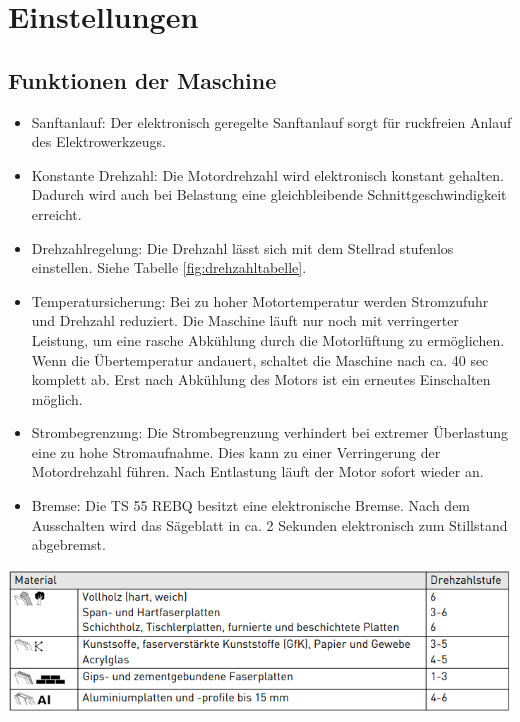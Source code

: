 \documentclass{\basedir/fablab-document}
\begin{document}
\section{Einstellungen}
\subsection{Funktionen der Maschine}
\begin{itemize}
\item Sanftanlauf: Der elektronisch geregelte Sanftanlauf sorgt für ruckfreien Anlauf des Elektrowerkzeugs.
\item Konstante Drehzahl: Die Motordrehzahl wird elektronisch konstant gehalten. Dadurch wird auch bei Belastung eine gleichbleibende Schnittgeschwindigkeit erreicht.
\item Drehzahlregelung: Die Drehzahl lässt sich mit dem Stellrad stufenlos einstellen. Siehe Tabelle \ref{fig:drehzahltabelle}.
\item Temperatursicherung: Bei zu hoher Motortemperatur werden Stromzufuhr und Drehzahl reduziert. Die Maschine läuft nur noch mit verringerter Leistung, um eine rasche Abkühlung durch die Motorlüftung zu ermöglichen. Wenn die Übertemperatur andauert, schaltet die Maschine nach ca. 40 sec komplett ab. Erst nach Abkühlung des Motors ist ein erneutes Einschalten möglich.
\item Strombegrenzung: Die Strombegrenzung verhindert bei extremer Überlastung eine zu hohe Stromaufnahme. Dies kann zu einer Verringerung der Motordrehzahl führen. Nach Entlastung läuft der Motor sofort wieder an.
\item Bremse: Die TS 55 REBQ besitzt eine elektronische Bremse. Nach dem Ausschalten wird das Sägeblatt in ca. 2 Sekunden elektronisch zum Stillstand abgebremst.
\end{itemize}

\centering
	\includegraphics[width=1\textwidth]{img/drehzahltabelle.png}
	\label{fig:drehzahltabelle}
\end{document}
